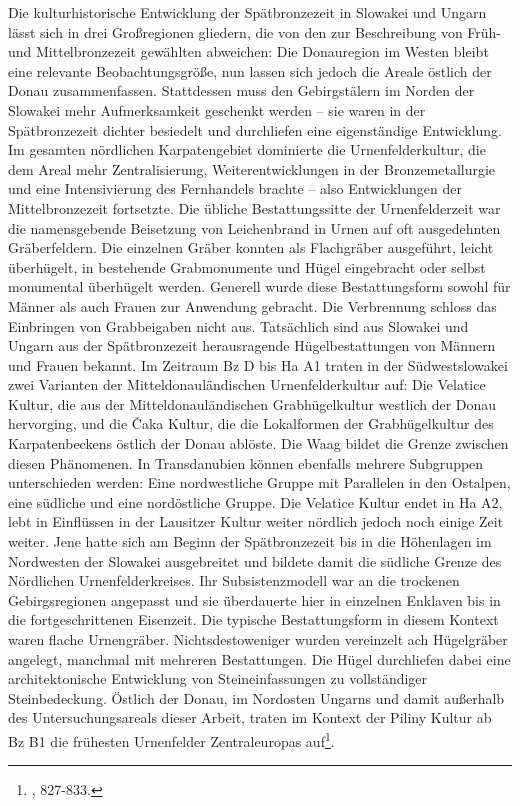 \documentclass[openany,twoside,twocolumn]{book}
\let\rmarkdownfootnote\footnote%
\def\footnote{\protect\rmarkdownfootnote}
\begin{document}
Die kulturhistorische Entwicklung der Spätbronzezeit in Slowakei und
Ungarn lässt sich in drei Großregionen gliedern, die von den zur
Beschreibung von Früh- und Mittelbronzezeit gewählten abweichen: Die
Donauregion im Westen bleibt eine relevante Beobachtungsgröße, nun
lassen sich jedoch die Areale östlich der Donau zusammenfassen.
Stattdessen muss den Gebirgstälern im Norden der Slowakei mehr
Aufmerksamkeit geschenkt werden -- sie waren in der Spätbronzezeit
dichter besiedelt und durchliefen eine eigenständige Entwicklung. Im
gesamten nördlichen Karpatengebiet dominierte die Urnenfelderkultur, die
dem Areal mehr Zentralisierung, Weiterentwicklungen in der
Bronzemetallurgie und eine Intensivierung des Fernhandels brachte --
also Entwicklungen der Mittelbronzezeit fortsetzte. Die übliche
Bestattungssitte der Urnenfelderzeit war die namensgebende Beisetzung
von Leichenbrand in Urnen auf oft ausgedehnten Gräberfeldern. Die
einzelnen Gräber konnten als Flachgräber ausgeführt, leicht überhügelt,
in bestehende Grabmonumente und Hügel eingebracht oder selbst monumental
überhügelt werden. Generell wurde diese Bestattungsform sowohl für
Männer als auch Frauen zur Anwendung gebracht. Die Verbrennung schloss
das Einbringen von Grabbeigaben nicht aus. Tatsächlich sind aus Slowakei
und Ungarn aus der Spätbronzezeit herausragende Hügelbestattungen von
Männern und Frauen bekannt. Im Zeitraum Bz D bis Ha A1 traten in der
Südwestslowakei zwei Varianten der Mitteldonauländischen
Urnenfelderkultur auf: Die Velatice Kultur, die aus der
Mitteldonauländischen Grabhügelkultur westlich der Donau hervorging, und
die Čaka Kultur, die die Lokalformen der Grabhügelkultur des
Karpatenbeckens östlich der Donau ablöste. Die Waag bildet die Grenze
zwischen diesen Phänomenen. In Transdanubien können ebenfalls mehrere
Subgruppen unterschieden werden: Eine nordwestliche Gruppe mit
Parallelen in den Ostalpen, eine südliche und eine nordöstliche Gruppe.
Die Velatice Kultur endet in Ha A2, lebt in Einflüssen in der Lausitzer
Kultur weiter nördlich jedoch noch einige Zeit weiter. Jene hatte sich
am Beginn der Spätbronzezeit bis in die Höhenlagen im Nordwesten der
Slowakei ausgebreitet und bildete damit die südliche Grenze des
Nördlichen Urnenfelderkreises. Ihr Subsistenzmodell war an die trockenen
Gebirgsregionen angepasst und sie überdauerte hier in einzelnen Enklaven
bis in die fortgeschrittenen Eisenzeit. Die typische Bestattungsform in
diesem Kontext waren flache Urnengräber. Nichtsdestoweniger wurden
vereinzelt ach Hügelgräber angelegt, manchmal mit mehreren Bestattungen.
Die Hügel durchliefen dabei eine architektonische Entwicklung von
Steineinfassungen zu vollständiger Steinbedeckung. Östlich der Donau, im
Nordosten Ungarns und damit außerhalb des Untersuchungsareals dieser
Arbeit, traten im Kontext der Piliny Kultur ab Bz B1 die frühesten
Urnenfelder Zentraleuropas auf\footnote{\textcite{markova_slovakia_2013},
  827-833.}.
\end{document}

